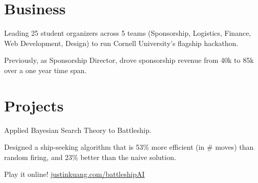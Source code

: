 \documentclass[]{deedy-resume-openfont}
\begin{document}
\begin{minipage}[t]{0.66\textwidth}
\section{Business}
{}
\begin{tightemize}
\item Leading 25 student organizers across 5 teams (Sponsorship, Logistics, Finance, Web Development, Design) to run Cornell University's flagship hackathon.
\item Previously, as Sponsorship Director, drove sponsorship revenue from 40k to 85k over a one year time span.
\end{tightemize}
\sectionsep



\section{Projects}

\begin{tightemize}
\item Applied Bayesian Search Theory to Battleship. 
\item Designed a ship-seeking algorithm that is 53\% more efficient (in \# moves) than random firing, and 23\% better than the naive solution.
\item Play it online! \href{https://justinkuang.com/battleshipAI}{\underline{justinkuang.com/battleshipAI}}
\end{tightemize}
\sectionsep


\end{minipage}
\end{document}
